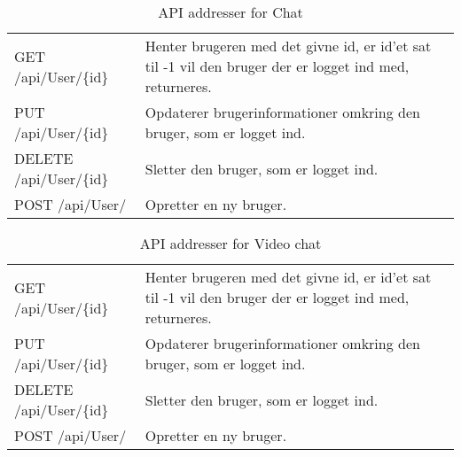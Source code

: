 \begin{table}[H]
	\centering
	\caption{API addresser for Chat}
	\label{tab:web_user}
	\begin{tabular}{|L{0.3\textwidth}|L{0.70\textwidth}|}
		\hline
		\\
		\hline
		GET \newline
		/api/User/\{id\} &
		Henter brugeren med det givne id, er id'et sat til -1 vil den bruger der er logget ind med, returneres. \\
		\hline
		PUT \newline
		/api/User/\{id\} &
		Opdaterer brugerinformationer omkring den bruger, som er logget ind. \\
		\hline
		DELETE \newline
		/api/User/\{id\} &
		Sletter den bruger, som er logget ind. \\
		\hline
		POST \newline
		/api/User/ &
		Opretter en ny bruger. \\
		\hline
	
	\end{tabular}
\end{table}

\begin{table}[H]
	\centering
	\caption{API addresser for Video chat}
	\label{tab:web_user}
	\begin{tabular}{|L{0.3\textwidth}|L{0.70\textwidth}|}
		\hline
		\\
		\hline
		GET \newline
		/api/User/\{id\} &
		Henter brugeren med det givne id, er id'et sat til -1 vil den bruger der er logget ind med, returneres. \\
		\hline
		PUT \newline
		/api/User/\{id\} &
		Opdaterer brugerinformationer omkring den bruger, som er logget ind. \\
		\hline
		DELETE \newline
		/api/User/\{id\} &
		Sletter den bruger, som er logget ind. \\
		\hline
		POST \newline
		/api/User/ &
		Opretter en ny bruger. \\
		\hline
	\end{tabular}
\end{table}